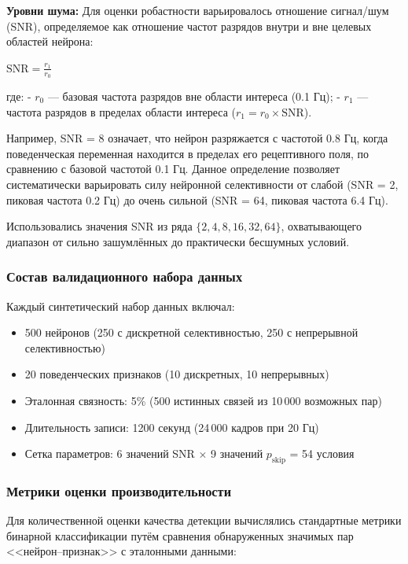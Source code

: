 \textbf{Уровни шума:} Для оценки робастности варьировалось отношение сигнал/шум
(SNR), определяемое как отношение частот разрядов внутри и вне
целевых областей нейрона:

$\text{SNR} = \frac{r_1}{r_0}$

где:
- $r_0$ --- базовая частота разрядов вне области интереса (0.1 Гц);
- $r_1$ --- частота разрядов в пределах области интереса ($r_1 = r_0 \times \text{SNR}$).

Например, SNR = 8 означает, что нейрон разряжается с частотой 0.8 Гц, когда поведенческая переменная
находится в пределах его рецептивного поля, по сравнению с базовой частотой 0.1 Гц. Данное определение
позволяет систематически варьировать силу нейронной селективности от слабой
(SNR = 2, пиковая частота 0.2 Гц) до очень сильной (SNR = 64, пиковая частота 6.4 Гц).

Использовались значения SNR из ряда $\{2, 4, 8, 16, 32, 64\}$, охватывающего диапазон
от сильно зашумлённых до практически бесшумных условий.

\subsubsection{Состав валидационного набора данных}
\label{sec:validation_dataset}

Каждый синтетический набор данных включал:
\begin{itemize}
\item 500 нейронов (250 с дискретной селективностью, 250 с непрерывной селективностью)
\item 20 поведенческих признаков (10 дискретных, 10 непрерывных)
\item Эталонная связность: 5\% (500 истинных связей из 10\,000 возможных пар)
\item Длительность записи: 1200 секунд (24\,000 кадров при 20 Гц)
\item Сетка параметров: 6 значений SNR $\times$ 9 значений $p_{\text{skip}}$ = 54 условия
\end{itemize}

\subsubsection{Метрики оценки производительности}
\label{sec:performance_metrics}

Для количественной оценки качества детекции вычислялись стандартные метрики бинарной классификации путём сравнения обнаруженных значимых пар <<нейрон--признак>> с эталонными данными:

